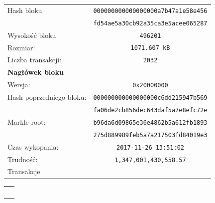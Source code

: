 \documentclass[12pt, oneside, final, openany]{mgr}
\begin{document}
\if@archive\else\newpage\fi
\begin{figure}[H]
	\begin{center}
  	\begin{tabular}{ | l  c | }
		\hline    
     	Hash bloku & \texttt{000000000000000000a7b47a1e58e456} \\
    			    & \texttt{fd54ae5a30cb92a35ca3e5acee065287} \\ 
    	Wysokość bloku & \texttt{496201} \\ 
    	Rozmiar: & \texttt{1071.607 kB} \\
   	 	Liczba transakcji: & \texttt{2032} \\ \hline
		\textbf{Nagłówek bloku}  &  \\  	 	
   	 	Wersja: & \texttt{0x20000000} \\   	 	
   	 	Hash poprzedniego bloku: &  \texttt{000000000000000000c6dd215947b569} \\
    							 &  \texttt{fa06de2cb856dec643daf5a7e8efc72e} \\ 
		Markle root: 			 & \texttt{b96da6d09865e36e4862b5a612fb1893} \\
								 & \texttt{275d889989feb5a7a217503fd84019e3} \\
   		Czas wykopania: & \texttt{2017-11-26 13:51:02} \\
   		Trudność: & \texttt{1,347,001,430,558.57}\\
   		\hline
   		Transakcje &\\
   		\hline 
 	\end{tabular}
	\end{center}
	
	\begin{center}
	\begin{tabular}{c} 
		\big\Downarrow\
	\end{tabular}
	\end{center}
	

\end{figure}
\end{document}
